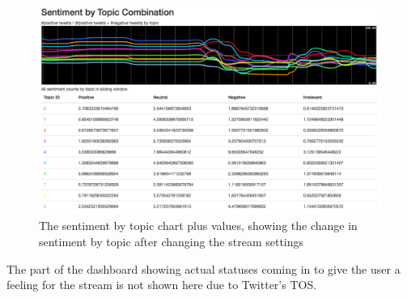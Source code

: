 \begin{figure}
    \centering
    \caption{The sentiment by topic chart plus values, showing the change in sentiment by topic after changing the stream settings}
    \label{fig:dashboard-sentiment-by-topic}
    \includegraphics[width=\textwidth]{../images/dashboard_sentiment_by_topic.png}
\end{figure}

The part of the dashboard showing actual statuses coming in to give the user a feeling for the stream is not shown here due to Twitter's TOS.